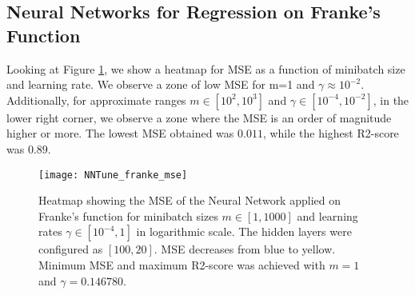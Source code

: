 \subsection{Neural Networks for Regression on Franke's Function}
Looking at Figure \ref{fig:TuneNN_mse}, we show a heatmap for MSE as a function of
minibatch size and learning rate. We observe a zone of low MSE for m=1 and $\gamma\approx 10^{-2}$.
Additionally, for approximate ranges $m\in[10^2, 10^3]$ and $\gamma\in[10^{-4}, 10^{-2}]$, in the lower right corner, we observe a zone where the MSE is an order of magnitude higher or more. The lowest MSE obtained was $0.011$, while the highest R2-score was $0.89$.
\begin{figure}[htbp]
	\centering
	\texttt{[image: NNTune\_franke\_mse]}
	\caption{Heatmap showing the MSE of the Neural Network applied on Franke's function for minibatch sizes $m\in[1, 1000]$ and learning rates $\gamma\in[10^{-4}, 1]$ in logarithmic scale. The hidden layers were configured as $[100, 20]$. MSE decreases from blue to yellow. Minimum MSE and maximum R2-score was achieved with $m=1$ and $\gamma=0.146780$.}
	\label{fig:TuneNN_mse}
\end{figure}
